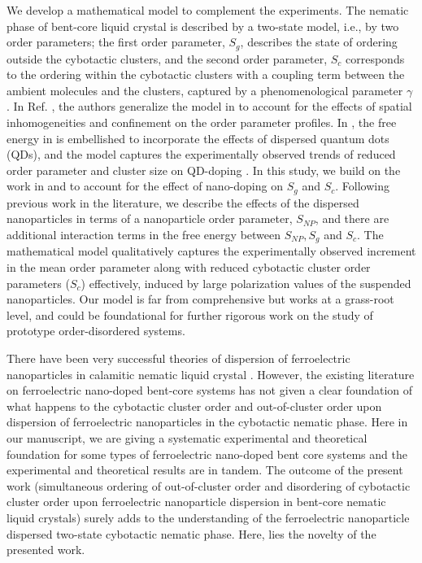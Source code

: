 \documentclass[reprint,amsfonts,amsmath,amssymb,aps,pre,floatfix,10pt]{revtex4-1}
\begin{document}
We develop a mathematical model to complement the experiments. The nematic phase of bent-core liquid crystal is described by a two-state model, i.e., by two order parameters; the first order parameter, $S_g$, describes the state of ordering outside the cybotactic clusters, and the second order parameter, $S_c$ corresponds to the ordering within the cybotactic clusters with a coupling term between the ambient molecules and the clusters, captured by a phenomenological parameter $\gamma$ \cite{madhusudana2017two_36}. In Ref. \cite{patranabish2019one_37}, the authors generalize the model in \cite{madhusudana2017two_36} to account for the effects of spatial inhomogeneities and confinement on the order parameter profiles. In \cite{patranabish2021quantum_38}, the free energy in \cite{patranabish2019one_37} is embellished to incorporate the effects of dispersed quantum dots (QDs), and the model captures the experimentally observed trends of reduced order parameter and cluster size on QD-doping \cite{patranabish2021quantum_38}. In this study, we build on the work in \cite{madhusudana2017two_36} and \cite{patranabish2019one_37} to account for the effect of nano-doping on $S_g$ and $S_c$. Following previous work in the literature, we describe the effects of the dispersed nanoparticles in terms of a nanoparticle order parameter, $S_{NP}$, and there are additional interaction terms in the free energy between $S_{NP}, S_g$ and $S_c$. The mathematical model qualitatively captures the experimentally observed increment in the mean order parameter along with reduced cybotactic cluster order parameters ($S_c$) effectively, induced by large polarization values of the suspended nanoparticles. Our model is far from comprehensive but works at a grass-root level, and could be foundational for further rigorous work on the study of prototype order-disordered systems.

There have been very successful theories of dispersion of ferroelectric nanoparticles in calamitic nematic liquid crystal \cite{lopatina2009theory_13}. However, the existing literature on ferroelectric nano-doped bent-core systems has not given a clear foundation of what happens to the cybotactic cluster order and out-of-cluster order upon dispersion of ferroelectric nanoparticles in the cybotactic nematic phase. Here in our manuscript, we are giving a systematic experimental and theoretical foundation for some types of ferroelectric nano-doped bent core systems and the experimental and theoretical results are in tandem. The outcome of the present work (simultaneous ordering of out-of-cluster order and disordering of cybotactic cluster order upon ferroelectric nanoparticle dispersion in bent-core nematic liquid crystals) surely adds to the understanding of the ferroelectric nanoparticle dispersed two-state cybotactic nematic phase. Here, lies the novelty of the presented work.
\end{document}
